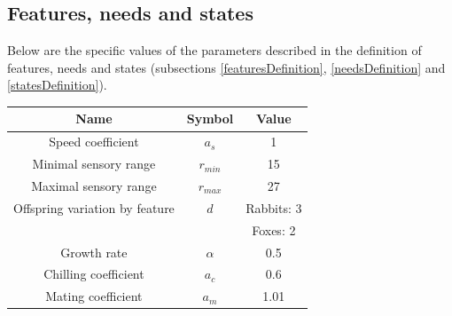 

\subsection{Features, needs and states}
\label{featuresNeedsStatesImplementation}
Below are the specific values of the parameters described in the definition of features, needs and states (subsections \ref{featuresDefinition}, \ref{needsDefinition} and \ref{statesDefinition}).
\begin{center}
    \begin{tabular}{ |c|c|c| } 
        \hline
        Name & Symbol & Value \\
        \hline \hline
        Speed coefficient & $a_s$ & 1 \\
        \hline
        Minimal sensory range & $r_{min}$ & 15 \\
        \hline
        Maximal sensory range & $r_{max}$ & 27 \\ 
        \hline
        Offspring variation by feature & $d$ & Rabbits: 3 \\
        &  & Foxes: 2 \\ 
        \hline
        Growth rate & $\alpha$ & 0.5 \\ 
        \hline
        Chilling coefficient & $a_c$ & 0.6 \\ 
        \hline
        Mating coefficient & $a_m$ & 1.01 \\ 
        \hline
    \end{tabular}
\end{center}



